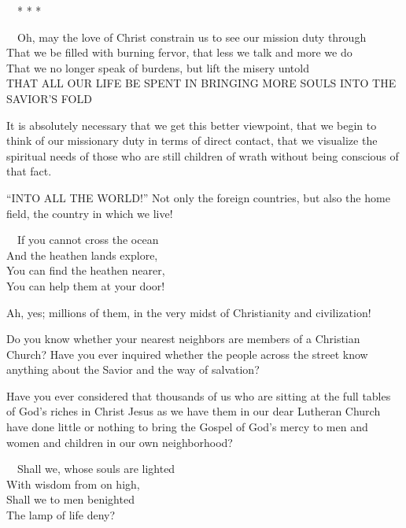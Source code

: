 \documentclass[
]{book}
\begin{document}
~~* * *

~~Oh, may the love of Christ constrain us to see our mission duty through\\
\hspace*{0.333em}\hspace*{0.333em}That we be filled with burning fervor, that less we talk and more we do\\
\hspace*{0.333em}\hspace*{0.333em}That we no longer speak of burdens, but lift the misery untold\\
\hspace*{0.333em}\hspace*{0.333em}THAT ALL OUR LIFE BE SPENT IN BRINGING MORE SOULS INTO THE SAVIOR'S FOLD

It is absolutely necessary that we get this better viewpoint, that we begin to think of our missionary duty in terms of direct contact, that we visualize the spiritual needs of those who are still children of wrath without being conscious of that fact.

``INTO ALL THE WORLD!'' Not only the foreign countries, but also the home field, the country in which we live!

~~If you cannot cross the ocean\\
\hspace*{0.333em}\hspace*{0.333em}And the heathen lands explore,\\
\hspace*{0.333em}\hspace*{0.333em}You can find the heathen nearer,\\
\hspace*{0.333em}\hspace*{0.333em}You can help them at your door!

Ah, yes; millions of them, in the very midst of Christianity and civilization!

Do you know whether your nearest neighbors are members of a Christian Church? Have you ever inquired whether the people across the street know anything about the Savior and the way of salvation?

Have you ever considered that thousands of us who are sitting at the full tables of God's riches in Christ Jesus as we have them in our dear Lutheran Church have done little or nothing to bring the Gospel of God's mercy to men and women and children in our own neighborhood?

~~Shall we, whose souls are lighted\\
\hspace*{0.333em}\hspace*{0.333em}With wisdom from on high,\\
\hspace*{0.333em}\hspace*{0.333em}Shall we to men benighted\\
\hspace*{0.333em}\hspace*{0.333em}The lamp of life deny?
\end{document}
